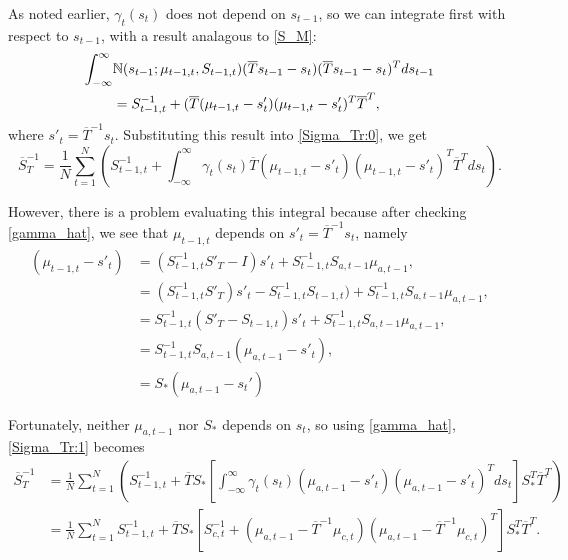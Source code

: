 \documentclass[12pt,leqno]{article}
\begin{document}
As noted earlier, $\gamma_t(s_t)$ does not depend on $s_{t-1}$, so we can integrate first with respect to $s_{t-1}$, with
a result analagous to \eqref{S_M}:
\begin{align*}
  \int_{-\infty}^{\infty}&{\mathbb N}(s_{t-1};\mu_{t-1,t},S_{t-1,t})(\overline{T}s_{t-1}-s_t)
  (\overline{T}s_{t-1}-s_t)^Tds_{t-1}\\ &= S_{t-1,t}^{-1} +
(\overline{T}(\mu_{t-1,t}-s'_t)(\mu_{t-1,t}-s'_t)^T\overline{T}^T,
\end{align*}
where $s'_t = \overline{T}^{-1}s_t$.
Substituting this result into \eqref{Sigma_Tr:0}, we get
\begin{equation}\label{Sigma_Tr:1}
  \overline{S}_T^{-1} =  \frac{1}{N}\sum_{t=1}^N\left(S_{t-1,t}^{-1} +\int_{-\infty}^{\infty}\gamma_t(s_t)
  \overline{T}(\mu_{t-1,t}-s'_t)(\mu_{t-1,t}-s'_t)^T\overline{T}^Tds_t\right).
\end{equation}

However, there is a problem evaluating this integral because after checking \eqref{gamma_hat}, we see that $\mu_{t-1,t}$
depends on $s'_t = \overline{T}^{-1}s_t$, namely 
\begin{equation}\label{s-mu_1}
  \begin{split}
    \left(\mu_{t-1,t}-s'_t\right) &= (S_{t-1,t}^{-1}S'_T - I)s'_t + S_{t-1,t}^{-1}S_{a,t-1}\mu_{a,t-1}, \\
    &= (S_{t-1,t}^{-1}S'_T)s'_t - S_{t-1,t}^{-1}S_{t-1,t}) + S_{t-1,t}^{-1}S_{a,t-1}\mu_{a,t-1}, \\
    &= S_{t-1,t}^{-1}(S'_T - S_{t-1,t} )s'_t + S_{t-1,t}^{-1}S_{a,t-1}\mu_{a,t-1}, \\
    &= S_{t-1,t}^{-1}S_{a,t-1}(\mu_{a,t-1}-s'_t),\\
    &= S_*(\mu_{a,t-1}-s_t')
  \end{split}
\end{equation}

Fortunately, neither $\mu_{a,t-1}$ nor $S_*$ depends on $s_t$,
so using \eqref{gamma_hat}, \eqref{Sigma_Tr:1} becomes
\begin{equation}\label{S_Tr:2}
  \begin{split}
  \overline{S}_T^{-1} &=\frac{1}{N}\sum_{t=1}^N\left(S_{t-1,t}^{-1} + \overline{T}S_*
  \left[\int_{-\infty}^{\infty}\gamma_t(s_t)(\mu_{a,t-1}-s'_t)(\mu_{a,t-1}-s'_t)^Tds_t\right]S_*^T\overline{T}^T\right)\\
   &=\frac{1}{N}\sum_{t=1}^NS_{t-1,t}^{-1} + \overline{T}S_*
           [S_{c,t}^{-1}+(\mu_{a,t-1}-\overline{T}^{-1}\mu_{c,t})(\mu_{a,t-1}-\overline{T}^{-1}\mu_{c,t})^T]
           S_*^T\overline{T}^T.
  \end{split}
\end{equation}
\end{document}
